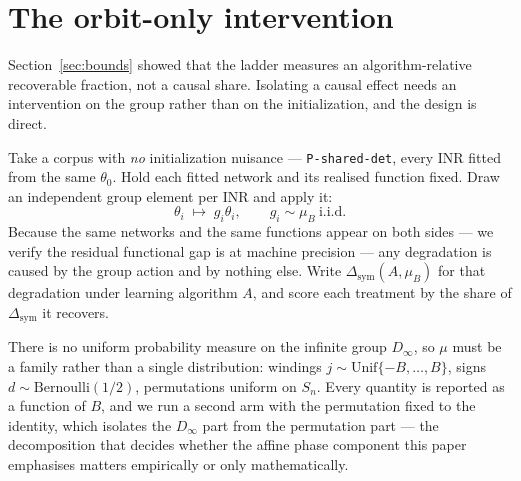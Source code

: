 \documentclass[10pt,twocolumn,letterpaper]{article}
\theoremstyle{definition}
\newcommand{\Dinf}{D_\infty}
\begin{document}
\section{The orbit-only intervention}\label{sec:orbit}

Section~\ref{sec:bounds} showed that the ladder measures an algorithm-relative recoverable
fraction, not a causal share. Isolating a causal effect needs an intervention on the group rather than
on the initialization, and the design is direct.

Take a corpus with \emph{no} initialization nuisance --- \texttt{P-shared-det}, every INR fitted
from the same $\theta_0$. Hold each fitted network and its realised function fixed. Draw an
independent group element per INR and apply it:
\begin{equation}
\theta_i \;\longmapsto\; g_i\theta_i, \qquad g_i \sim \mu_B \ \text{i.i.d.}
\label{eq:orbit-intervention}
\end{equation}
Because the same networks and the same functions appear on both sides --- we verify the residual
functional gap is at machine precision --- any degradation is caused by the group action and by
nothing else. Write $\Delta_{\mathrm{sym}}(A,\mu_B)$ for that degradation under learning algorithm
$A$, and score each treatment by the share of $\Delta_{\mathrm{sym}}$ it recovers.

There is no uniform probability measure on the infinite group $\Dinf$, so $\mu$ must be a family
rather than a single distribution: windings $j \sim \mathrm{Unif}\{-B,\dots,B\}$, signs
$d \sim \mathrm{Bernoulli}(1/2)$, permutations uniform on $S_n$. Every quantity is reported as a
function of $B$, and we run a second arm with the permutation fixed to the identity, which isolates
the $\Dinf$ part from the permutation part --- the decomposition that decides whether the affine
phase component this paper emphasises matters empirically or only mathematically.


\end{document}
